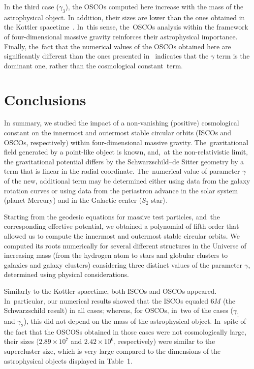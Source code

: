 \documentclass[aps,amsmath,amssymb,twocolumn]{revtex4}
\begin{document}
In the third case ($\gamma_3$), the OSCOs computed here increase with the mass of the astrophysical object. In addition, their sizes are lower than the ones obtained in the Kottler spacetime~\cite{Boonserm:2019nqq}. In~this sense, the~OSCOs analysis within the framework of four-dimensional massive gravity reinforces their astrophysical importance. Finally, the~fact that the numerical values of the OSCOs obtained here are significantly different than the ones presented in~\cite{Boonserm:2019nqq} indicates that the $\gamma$ term is the dominant one, rather than the cosmological constant~term.





\section{Conclusions\label{sec6}}


In summary, we  studied the impact of a non-vanishing (positive) cosmological constant on the innermost and outermost stable circular orbits (ISCOs and OSCOs, respectively) within four-dimensional massive gravity. The~gravitational field generated by a point-like object is known, and,~at the non-relativistic limit, the gravitational potential differs by the Schwarzschild--de Sitter geometry by a term that is linear in the radial coordinate. The~numerical value of parameter $\gamma$ of the new, additional term may be determined either using data from the galaxy rotation curves or using data from the periastron advance in the solar system (planet Mercury) and in the Galactic center ($S_2$ star). 

Starting from the geodesic equations for massive test particles, and~the corresponding effective potential, we  obtained a polynomial of fifth order that allowed us to compute the innermost and outermost stable circular orbits. We  computed its roots numerically for several different structures in the Universe of increasing mass (from the hydrogen atom to stars and globular clusters to galaxies and galaxy clusters) considering three distinct values of the parameter $\gamma$, determined using physical considerations. 

Similarly to the Kottler spacetime, both ISCOs and OSCOs appeared. In~particular, our numerical results showed that the ISCOs equaled $6M$ (the Schwarzschild result) in all cases; whereas, for OSCOs, in~two of the cases ($\gamma_1$ and $\gamma_2$), this did not depend on the mass of the astrophysical object. In~spite of the fact that the OSCOSs obtained in those cases were not cosmologically large, their sizes ($2.89 \times 10^{7}$ and $2.42 \times 10^{6}$, respectively) were similar to the supercluster size, which is very large compared to the dimensions of the astrophysical objects displayed in Table~1. 
\end{document}
